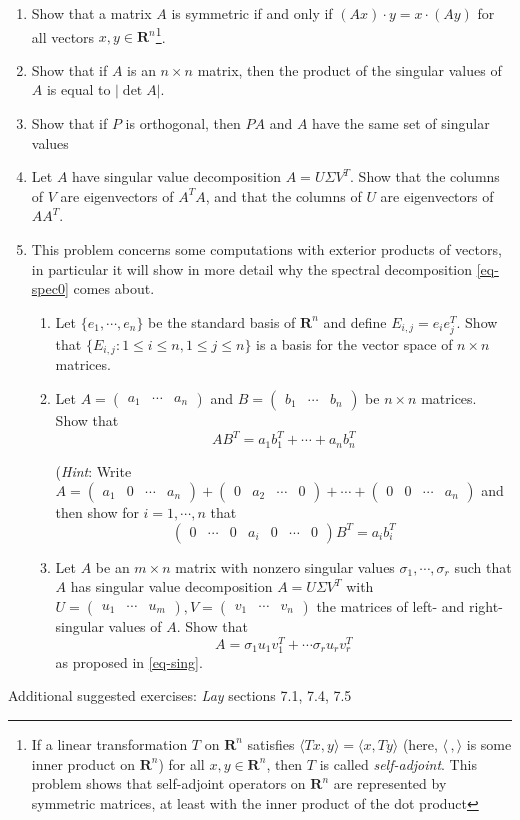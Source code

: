 \documentclass[12pt]{article}
\numberwithin{equation}{subsection}
\numberwithin{figure}{subsection}
\theoremstyle{note}
\newcommand{\R}{\mathbf{R}}
\newcommand\ip[2]{\langle #1, #2\rangle}
\newcommand\m[1]{\begin{pmatrix}#1\end{pmatrix}}
\begin{document}
\begin{enumerate}[label=\arabic*.]
\item Show that a matrix $A$ is symmetric if and only if $(Ax)\cdot y=x\cdot (Ay)$ for all vectors $x,y\in \R^n$\footnote{If a linear transformation $T$ on $\R^n$ satisfies $\langle Tx,y\rangle=\langle x,Ty\rangle$ (here, $\ip{\,}{}$ is some inner product on $\R^n$) for all $x,y\in \R^n$, then $T$ is called \textit{self-adjoint}. This problem shows that self-adjoint operators on $\R^n$ are represented by symmetric matrices, at least with the inner product of the dot product}.
\item Show that if $A$ is an $n\times n$ matrix, then the product of the singular values of $A$ is equal to $|\det A|$.

\item Show that if $P$ is orthogonal, then $PA$ and $A$ have the same set of singular values

\item Let $A$ have singular value decomposition $A=U\Sigma V^T$. Show that the columns of $V$ are eigenvectors of $A^TA$, and that the columns of $U$ are eigenvectors of $AA^T$. 




\item This problem concerns some computations with exterior products of vectors, in particular it will show in more detail why the spectral decomposition \eqref{eq-spec0} comes about.
\begin{enumerate}
\item Let $\{e_1,\cdots,e_n\}$ be the standard basis of $\R^n$ and define $E_{i,j}=e_ie_j^T$. Show that $\{ E_{i,j} : 1\leq i\leq n, 1\leq j\leq n\}$ is a basis for the vector space of $n\times n$ matrices. 
\item Let $A=\m{a_1 & \cdots & a_n}$ and $B=\m{b_1 & \cdots & b_n}$ be $n\times n$ matrices. Show that \begin{equation} AB^T=a_1b_1^T + \cdots + a_nb_n^T \end{equation}

(\textit{Hint}: Write $A=\m{a_1 & 0 & \cdots & a_n}+\m{0 & a_2 & \cdots & 0}+\cdots+\m{0 & 0 & \cdots & a_n}$ and then show for $i=1,\cdots,n$ that \[ \m{0 & \cdots & 0 & a_i & 0 & \cdots & 0} B^T=a_ib_i^T\]


\item Let $A$ be an $m\times n$ matrix with nonzero singular values $\sigma_1,\cdots,\sigma_r$ such that $A$ has singular value decomposition $A=U\Sigma V^T$ with $U=\m{u_1 & \cdots & u_m}, V=\m{v_1 & \cdots & v_n}$ the matrices of left- and right- singular values of $A$. Show that  
	\[A=\sigma_1 u_1v_1^T+\cdots \sigma_r u_r v_r^T\]
	as proposed in \eqref{eq-sing}.
\end{enumerate}
\end{enumerate}
Additional suggested exercises: \textit{Lay} sections 7.1, 7.4, 7.5
\end{document}

